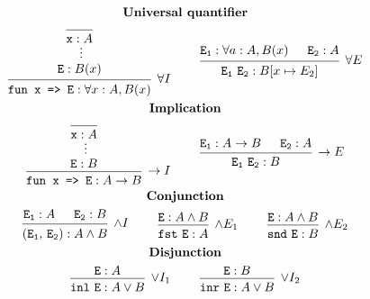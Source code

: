 \documentclass[convert={density=500}, border=2pt, varwidth=8in]{standalone}
\begin{document}
\begin{spreadlines}{2em}
\begin{gather*}
\textbf{Universal quantifier} \\
\begin{prooftree}
    \infer0{\mathtt{x} : A}
    \ellipsis{}{\mathtt{E} : B(x)}
    \infer1[$\forall I$]{\texttt{fun x => E} : \forall x : A, B(x)}
\end{prooftree}
~ \qquad
\begin{prooftree}
   \hypo{\mathtt{E_1} : \forall a : A, B(x)}
   \hypo{\mathtt{E_2} : A}
   \infer2[$\forall E$]{\mathtt{E_1 \,\, E_2} : B[x \mapsto E_2]} 
\end{prooftree}
\\ \textbf{Implication} \\
\begin{prooftree}
    \infer0{\mathtt{x} : A}
    \ellipsis{}{\mathtt{E} : B}
    \infer1[$\rightarrow I$]{\texttt{fun x => E} : A \rightarrow B}
\end{prooftree}
~ \qquad
\begin{prooftree}
   \hypo{\mathtt{E_1} : A \rightarrow B}
   \hypo{\mathtt{E_2} : A}
   \infer2[$\rightarrow E$]{\mathtt{E_1 \,\, E_2} : B} 
\end{prooftree}
\\ \textbf{Conjunction} \\
\begin{prooftree}
    \hypo{\mathtt{E_1} : A}
    \hypo{\mathtt{E_2} : B}
    \infer2[$\wedge I$]{\mathtt{(E_1, \, E_2)} : A \wedge B}
\end{prooftree}
~ \qquad
\begin{prooftree}
    \hypo{\mathtt{E} : A \wedge B}
    \infer1[$\wedge E_1$]{\mathtt{fst \,\, E} : A}
\end{prooftree}
~ \qquad
\begin{prooftree}
    \hypo{\mathtt{E} : A \wedge B}
    \infer1[$\wedge E_2$]{\mathtt{snd \,\, E} : B}
\end{prooftree}
\\ \textbf{Disjunction} \\
\begin{prooftree}
    \hypo{\mathtt{E} : A}
    \infer1[$\vee I_1$]{\mathtt{inl \,\, E} : A \vee B}
\end{prooftree}
~ \qquad
\begin{prooftree}
    \hypo{\mathtt{E} : B}
    \infer1[$\vee I_2$]{\mathtt{inr \,\, E} : A \vee B}
\end{prooftree}
\\

\end{gather*}
\end{spreadlines}
\end{document}
